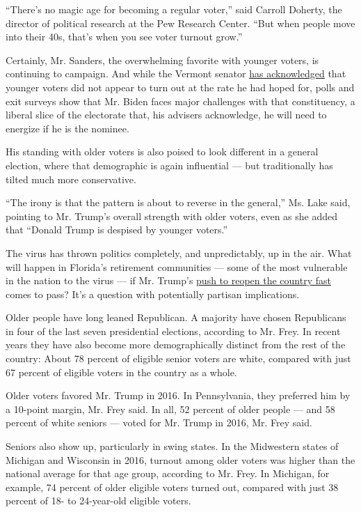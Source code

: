 ``There's no magic age for becoming a regular voter,'' said Carroll
Doherty, the director of political research at the Pew Research Center.
``But when people move into their 40s, that's when you see voter turnout
grow.''

Certainly, Mr. Sanders, the overwhelming favorite with younger voters,
is continuing to campaign. And while the Vermont senator
\href{https://www.nytimes.com/2020/03/04/us/politics/bernie-sanders-young-voter-turnout.html}{has
acknowledged} that younger voters did not appear to turn out at the rate
he had hoped for, polls and exit surveys show that Mr. Biden faces major
challenges with that constituency, a liberal slice of the electorate
that, his advisers acknowledge, he will need to energize if he is the
nominee.

His standing with older voters is also poised to look different in a
general election, where that demographic is again influential --- but
traditionally has tilted much more conservative.

``The irony is that the pattern is about to reverse in the general,''
Ms. Lake said, pointing to Mr. Trump's overall strength with older
voters, even as she added that ``Donald Trump is despised by younger
voters.''

The virus has thrown politics completely, and unpredictably, up in the
air. What will happen in Florida's retirement communities --- some of
the most vulnerable in the nation to the virus --- if Mr. Trump's
\href{https://www.nytimes.com/2020/03/23/business/trump-coronavirus-economy.html}{push
to reopen the country fast} comes to pass? It's a question with
potentially partisan implications.

Older people have long leaned Republican. A majority have chosen
Republicans in four of the last seven presidential elections, according
to Mr. Frey. In recent years they have also become more demographically
distinct from the rest of the country: About 78 percent of eligible
senior voters are white, compared with just 67 percent of eligible
voters in the country as a whole.

Older voters favored Mr. Trump in 2016. In Pennsylvania, they preferred
him by a 10-point margin, Mr. Frey said. In all, 52 percent of older
people --- and 58 percent of white seniors --- voted for Mr. Trump in
2016, Mr. Frey said.

Seniors also show up, particularly in swing states. In the Midwestern
states of Michigan and Wisconsin in 2016, turnout among older voters was
higher than the national average for that age group, according to Mr.
Frey. In Michigan, for example, 74 percent of older eligible voters
turned out, compared with just 38 percent of 18- to 24-year-old eligible
voters.

